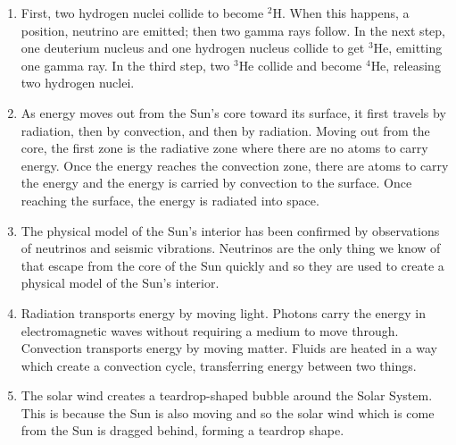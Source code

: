 \documentclass[../hw2.tex]{subfiles}
\begin{document}

    \newcommand\usc[1]{${}^#1$}

    \begin{enumerate}
        \item {} First, two hydrogen nuclei collide to become \usc{2}H. When this happens, a position, neutrino are emitted; then two gamma rays follow. In the next step, one deuterium nucleus and one hydrogen nucleus collide to get \usc{3}He, emitting one gamma ray. In the third step, two \usc{3}He collide and become \usc{4}He, releasing two hydrogen nuclei.
        \item {} As energy moves out from the Sun's core toward its surface, it first travels by radiation, then by convection, and then by radiation. Moving out from the core, the first zone is the radiative zone where there are no atoms to carry energy. Once the energy reaches the convection zone, there are atoms to carry the energy and the energy is carried by convection to the surface. Once reaching the surface, the energy is radiated into space.
        \item {} The physical model of the Sun's interior has been confirmed by observations of neutrinos and seismic vibrations. Neutrinos are the only thing we know of that escape from the core of the Sun quickly and so they are used to create a physical model of the Sun's interior.%
        \item {} Radiation transports energy by moving light. Photons carry the energy in electromagnetic waves without requiring a medium to move through. Convection transports energy by moving matter. Fluids are heated in a way which create a convection cycle, transferring energy between two things. 
        \item {} The solar wind creates a teardrop-shaped bubble around the Solar System. This is because the Sun is also moving and so the solar wind which is come from the Sun is dragged behind, forming a teardrop shape.%
    \end{enumerate}
    
\end{document}
